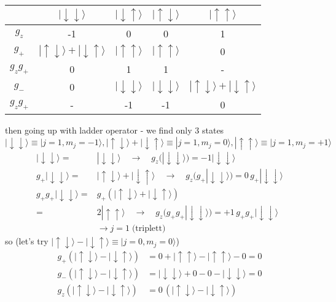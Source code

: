 \documentclass[../main.tex]{subfiles}
\begin{document}
\begin{itemize}
\begin{table}[!h]
\centering
\begin{tabular}{c | c c c c}
&$|\downarrow\downarrow\rangle$&
$|\downarrow\uparrow\rangle$&
$|\uparrow\downarrow\rangle$&
$|\uparrow\uparrow\rangle$\\ \hline\hline
$g_{z}$ & -1 & 0 & 0 & 1\\
$g_{+}$ & 
$|\uparrow\downarrow\rangle+|\downarrow\uparrow\rangle$&
$|\uparrow\uparrow\rangle$&
$|\uparrow\uparrow\rangle$&
0\\
$g_zg_{+}$ & 0 & 1 & 1 & - \\
$g_{-}$ & 
0 &
$|\downarrow\downarrow\rangle$&
$|\downarrow\downarrow\rangle$&
$|\uparrow\downarrow\rangle+|\downarrow\uparrow\rangle$\\
$g_zg_{+}$ & - & -1 & -1 & 0 \\
\end{tabular}
\end{table}
then going up with ladder operator - we find only 3 states $|\downarrow\downarrow\rangle\equiv|j=1,m_j=-1\rangle,|\uparrow\downarrow\rangle+|\downarrow\uparrow\rangle\equiv|j=1,m_j=0\rangle,|\uparrow\uparrow\rangle\equiv|j=1,m_j=+1\rangle$
\begin{align}
|\downarrow\downarrow\rangle=&|\downarrow\downarrow\rangle
\quad\rightarrow\quad g_z(|\downarrow\downarrow\rangle)=-1|\downarrow\downarrow\rangle\\
g_+|\downarrow\downarrow\rangle
=&|\uparrow\downarrow\rangle+|\downarrow\uparrow\rangle\quad\rightarrow\quad g_z(g_+|\downarrow\downarrow\rangle)=0\,g_+|\downarrow\downarrow\rangle\\
g_+g_+|\downarrow\downarrow\rangle
=&g_+(|\uparrow\downarrow\rangle+|\downarrow\uparrow\rangle)\\
=&2|\uparrow\uparrow\rangle\quad\rightarrow\quad g_z(g_+g_+|\downarrow\downarrow\rangle)=+1\,g_+g_+|\downarrow\downarrow\rangle\\
&\rightarrow j=1 \;\text{(triplett)}
\end{align}
so (let's try $|\uparrow\downarrow\rangle-|\downarrow\uparrow\rangle\equiv|j=0,m_j=0\rangle$)
\begin{align}
g_+(|\uparrow\downarrow\rangle-|\downarrow\uparrow\rangle)
&=0+|\uparrow\uparrow\rangle-|\uparrow\uparrow\rangle-0=0\\
g_-(|\uparrow\downarrow\rangle-|\downarrow\uparrow\rangle)
&=|\downarrow\downarrow\rangle+0-0-|\downarrow\downarrow\rangle=0\\
g_z(|\uparrow\downarrow\rangle-|\downarrow\uparrow\rangle) &= 0\,(|\uparrow\downarrow\rangle-|\downarrow\uparrow\rangle)\\

\end{align}
\end{itemize}
\end{document}
